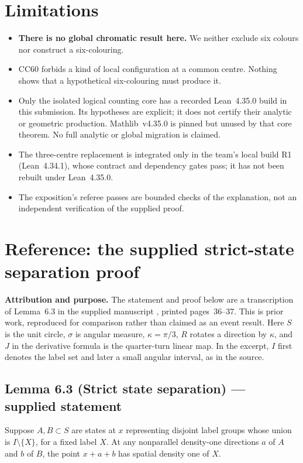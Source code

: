 \documentclass[11pt]{article}
\theoremstyle{definition}
\theoremstyle{remark}
\begin{document}
\section{Limitations}
\begin{itemize}
\item \textbf{There is no global chromatic result here.} We neither exclude six colours nor construct a six-colouring.
\item CC60 forbids a kind of local configuration at a common centre. Nothing shows that a hypothetical six-colouring must produce it.
\item Only the isolated logical counting core has a recorded Lean~4.35.0 build
in this submission. Its hypotheses are explicit; it does not certify their
analytic or geometric production. Mathlib~v4.35.0 is pinned but unused by that
core theorem. No full analytic or global migration is claimed.
\item The three-centre replacement is integrated only in the team's local build R1 (Lean~4.34.1), whose contract and dependency gates pass; it has not been rebuilt under Lean~4.35.0.
\item The exposition's referee passes are bounded checks of the explanation, not an independent verification of the supplied proof.
\end{itemize}

\clearpage
\appendix
\section{Reference: the supplied strict-state separation proof}
\label{app:original-separation}

\noindent\textbf{Attribution and purpose.} The statement and proof below are a
transcription of Lemma~6.3 in the supplied manuscript \cite{OAI}, printed
pages~36--37. This is prior work, reproduced for comparison rather than claimed
as an event result. Here $S$ is the unit circle, $\sigma$ is angular measure,
$\kappa=\pi/3$, $R$ rotates a direction by $\kappa$, and $J$ in the derivative
formula is the quarter-turn linear map. In the excerpt, $I$ first denotes the
label set and later a small angular interval, as in the source.

\subsection*{Lemma 6.3 (Strict state separation) --- supplied statement}
Suppose $A,B\subset S$ are states at $x$ representing disjoint label groups
whose union is $I\setminus\{X\}$, for a fixed label $X$. At any nonparallel
density-one directions $a$ of $A$ and $b$ of $B$, the point $x+a+b$ has spatial
density one of $X$.
\end{document}
